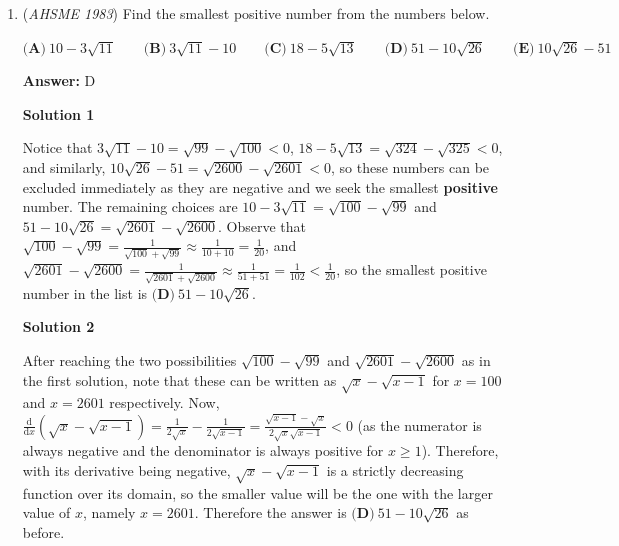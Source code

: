 \begin{enumerate}
 Thus, the answer is $\boxed{\textbf{(C)} \ \frac{p}{q^2}}$.

 



\textbf{Solution 2 (Root Construction)}

Since cotangent is the reciprocal of tangent, we know that $qx^2 - px + 1$ has roots of $\cot{\alpha}$ and $\cot{\beta}$. To get in the form of $x^2 - rx + s$, we can divide by $q$, and multiplying r and s, we get $\boxed{\textbf{(C)} \ \frac{p}{q^2}}$.~AncientKarnivore

 


	\item (\textit{AHSME 1983}) Find the smallest positive number from the numbers below.


 $\textbf{(A)} \ 10-3\sqrt{11} \qquad  \textbf{(B)} \ 3\sqrt{11}-10 \qquad  \textbf{(C)}\ 18-5\sqrt{13}\qquad \textbf{(D)}\ 51-10\sqrt{26}\qquad \textbf{(E)}\ 10\sqrt{26}-51$

 \textbf{Answer: }D



\textbf{Solution 1}

Notice that $3\sqrt{11} - 10 = \sqrt{99} - \sqrt{100} < 0$, $18 - 5\sqrt{13} = \sqrt{324} - \sqrt{325} < 0$, and similarly, $10\sqrt{26} - 51 = \sqrt{2600} - \sqrt{2601} < 0$, so these numbers can be excluded immediately as they are negative and we seek the smallest \textbf{positive} number. The remaining choices are $10 - 3\sqrt{11} = \sqrt{100} - \sqrt{99}$ and $51 - 10\sqrt{26} = \sqrt{2601} - \sqrt{2600}$. Observe that $\sqrt{100} - \sqrt{99} = \frac{1}{\sqrt{100} + \sqrt{99}} \approx \frac{1}{10+10} = \frac{1}{20}$, and $\sqrt{2601} - \sqrt{2600} = \frac{1}{\sqrt{2601} + \sqrt{2600}} \approx \frac{1}{51+51} = \frac{1}{102} < \frac{1}{20}$, so the smallest positive number in the list is $\boxed{\textbf{(D)} \ 51 - 10 \sqrt{26}}$.

 



\textbf{Solution 2}

After reaching the two possibilities $\sqrt{100}-\sqrt{99}$ and $\sqrt{2601}-\sqrt{2600}$ as in the first solution, note that these can be written as $\sqrt{x}-\sqrt{x-1}$ for $x=100$ and $x=2601$ respectively. Now, $\frac{\mathrm{d}}{\mathrm{d}x}\left(\sqrt{x}-\sqrt{x-1}\right) = \frac{1}{2\sqrt{x}} - \frac{1}{2\sqrt{x-1}} = \frac{\sqrt{x-1} - \sqrt{x}}{2\sqrt{x}\sqrt{x-1}} < 0$ (as the numerator is always negative and the denominator is always positive for $x \geq 1$). Therefore, with its derivative being negative, $\sqrt{x}-\sqrt{x-1}$ is a strictly decreasing function over its domain, so the smaller value will be the one with the larger value of $x$, namely $x = 2601$. Therefore the answer is $\boxed{\textbf{(D)} \ 51 - 10 \sqrt{26}}$ as before.


\end{enumerate}

